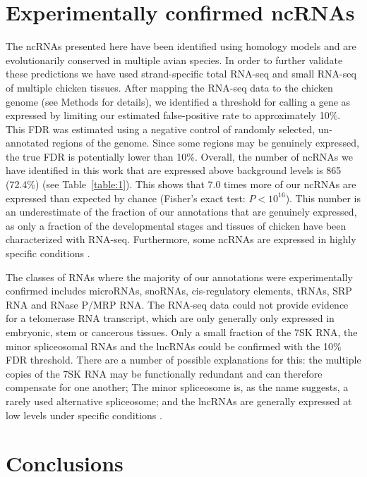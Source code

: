 \documentclass[10pt]{bmc_article}
\newenvironment{bmcformat}{\begin{raggedright}\baselineskip20pt\sloppy\setboolean{publ}{false}}{\end{raggedright}\baselineskip20pt\sloppy}
\begin{document}
\begin{bmcformat}
\section*{Experimentally confirmed ncRNAs}

The ncRNAs presented here have been identified using homology models
and are evolutionarily conserved in multiple avian species. In order
to further validate these predictions we have used strand-specific
total RNA-seq and small RNA-seq of multiple chicken tissues. After
mapping the RNA-seq data to the chicken genome (see Methods for
details), we identified a threshold for calling a gene as expressed by
limiting our estimated false-positive rate to approximately 10\%. This
FDR was estimated using a negative control of randomly selected,
un-annotated regions of the genome. Since some regions may be
genuinely expressed, the true FDR is potentially lower than
10\%. Overall, the number of ncRNAs we have identified in this work
that are expressed above background levels is 865 (72.4\%) (see
Table~\ref{table:1}). This shows that 7.0 times more of our ncRNAs are
expressed than expected by chance (Fisher's exact test:
$P<10^{16}$). This number is an underestimate of the fraction of our
annotations that are genuinely expressed, as only a fraction of the
developmental stages and tissues of chicken have been characterized
with RNA-seq. Furthermore, some ncRNAs are expressed in highly
specific conditions \cite{mercer2008specific,johnston2003microrna}.

The classes of RNAs where the majority of our annotations were
experimentally confirmed includes microRNAs, snoRNAs, cis-regulatory
elements, tRNAs, SRP RNA and RNase P/MRP RNA. The RNA-seq data could
not provide evidence for a telomerase RNA transcript, which are only
generally only expressed in embryonic, stem or cancerous tissues. Only
a small fraction of the 7SK RNA, the minor spliceosomal RNAs and the
lncRNAs could be confirmed with the 10\% FDR threshold. There are a
number of possible explanations for this: the multiple copies of the
7SK RNA may be functionally redundant and can therefore compensate for
one another; The minor spliceosome is, as the name suggests, a rarely
used alternative spliceosome; and the lncRNAs are generally expressed
at low levels under specific conditions
\cite{mercer2008specific,mercer2012targeted}.


\section*{Conclusions}


\end{bmcformat}
\end{document}
